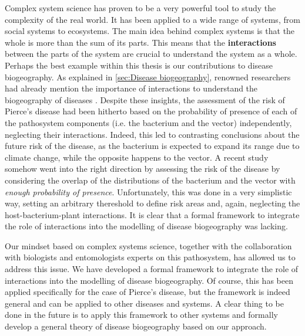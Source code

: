 Complex system science has proven to be a very powerful tool to study the
complexity of the real world. It has been applied to a wide range of systems,
from social systems to ecosystems. The main idea behind complex systems is that
the whole is more than the sum of its parts. This means that the
\textbf{interactions} between the parts of the system are crucial to understand
the system as a whole. Perhaps the best example within this thesis is our
contributions to disease biogeography. As explained in \cref{sec:Disease
    biogeography}, renowned researchers had already mention the importance of
interactions to understand the biogeography of diseases \cite{Peterson2008}.
Despite these insights, the assessment of the risk of Pierce's disease had been
hitherto based on the probability of presence of each of the pathosystem
components (i.e. the bacterium and the vector) independently, neglecting their
interactions. Indeed, this led to contrasting conclusions about the future risk
of the disease, as the bacterium is expected to expand its range due to climate
change, while the opposite happens to the vector. A recent study somehow went
into the right direction by assessing the risk of the disease by considering
the overlap of the distributions of the bacterium and the vector with
\textit{enough probability of presence}. Unfortunately, this was done in a very
simplistic way, setting an arbitrary thereshold to define risk areas and,
again, neglecting the host-bacterium-plant interactions. It is clear that a
formal framework to integrate the role of interactions into the modelling of
disease biogeography was lacking.

Our mindset based on complex systems science, together with the collaboration
with biologists and entomologists experts on this pathosystem, has allowed us
to address this issue. We have developed a formal framework to integrate the
role of interactions into the modelling of disease biogeography. Of course,
this has been applied specifically for the case of Pierce's disease, but the
framework is indeed general and can be applied to other diseases and systems.
A clear thing to be done in the future is to apply this framework to other
systems and formally develop a general theory of disease biogeography based on
our approach.

